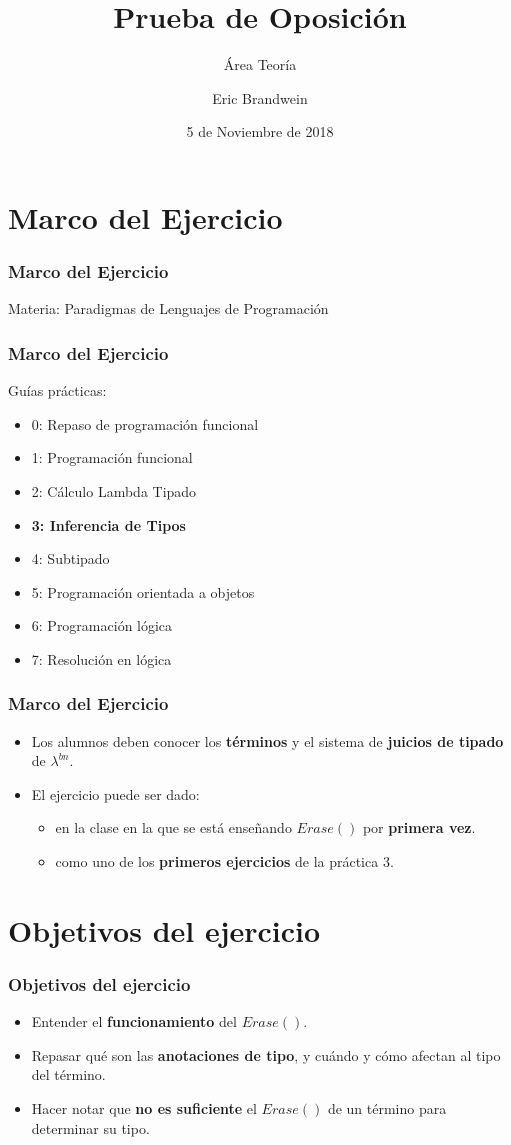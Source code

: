 \documentclass{beamer}
\title{Prueba de Oposición}
\subtitle{Área Teoría}
\institute{Universidad de Buenos Aires, FCEyN}
\author{Eric Brandwein}
\date{5 de Noviembre de 2018}
\begin{document}
\frame{\titlepage}

\section{Marco del Ejercicio}
\begin{frame}
\frametitle{Marco del Ejercicio}

Materia: Paradigmas de Lenguajes de Programación

\end{frame}

\begin{frame}
\frametitle{Marco del Ejercicio}
Guías prácticas:
\begin{itemize}
    \item 0: Repaso de programación funcional
    \item 1: Programación funcional
    \item 2: Cálculo Lambda Tipado
    \item \textbf{3: Inferencia de Tipos}
    \item 4: Subtipado
    \item 5: Programación orientada a objetos
    \item 6: Programación lógica
    \item 7: Resolución en lógica
\end{itemize}
\end{frame}


\begin{frame}
\frametitle{Marco del Ejercicio}

\begin{itemize}
    \item Los alumnos deben conocer los \textbf{términos}
        y el sistema de \textbf{juicios de tipado}
        de $\lambda^{bn}$.
    \item El ejercicio puede ser dado:
    \begin{itemize}
        \item en la clase en la que se está enseñando
            $Erase()$ por \textbf{primera vez}.
        \item como uno de los \textbf{primeros ejercicios} de
            la práctica 3.
    \end{itemize}
\end{itemize}
\end{frame}

\section{Objetivos del ejercicio}
\begin{frame}
\frametitle{Objetivos del ejercicio}
\begin{itemize}
    \item Entender el \textbf{funcionamiento} del $Erase()$.
    \item Repasar qué son las \textbf{anotaciones de tipo},
        y cuándo y cómo afectan al tipo del término.
    \item Hacer notar que \textbf{no es suficiente} el
        $Erase()$ de un término para determinar su tipo.
\end{itemize}
\end{frame}
\end{document}
